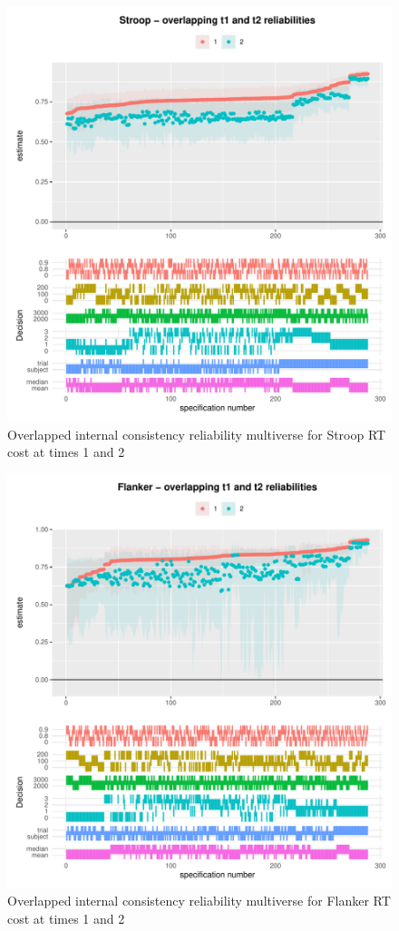 \documentclass[
  man,floatsintext]{apa6}
\begin{document}
\begin{figure}
\centering
\includegraphics{Reliability_Multiverse_files/figure-latex/unnamed-chunk-11-1.pdf}
\caption{\label{fig:unnamed-chunk-11}Overlapped internal consistency reliability multiverse for Stroop RT cost at times 1 and 2}
\end{figure}

\begin{figure}
\centering
\includegraphics{Reliability_Multiverse_files/figure-latex/unnamed-chunk-12-1.pdf}
\caption{\label{fig:unnamed-chunk-12}Overlapped internal consistency reliability multiverse for Flanker RT cost at times 1 and 2}
\end{figure}
\end{document}
